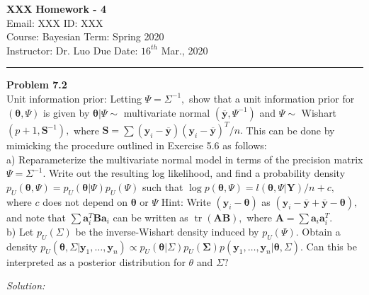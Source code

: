 \documentclass[a4paper, 11pt]{article}
\newenvironment{problem}[2][Problem]
    { \begin{mdframed}[backgroundcolor=gray!20] \textbf{#1 #2} \\}
    {  \end{mdframed}}
\newenvironment{solution}
    {\textit{Solution:}}
    {}
\begin{document}
\noindent
\large\textbf{XXX} \hfill \textbf{Homework - 4}   \\
Email: XXX \hfill ID: XXX \\
\normalsize Course: Bayesian \hfill Term: Spring 2020\\
Instructor: Dr. Luo  \hfill Due Date: $16^{th}$ Mar., 2020 \\
\noindent\rule{7in}{2.8pt}

\begin{problem}{7.2}
Unit information prior: Letting $\Psi=\Sigma^{-1},$ show that a unit information prior for $(\boldsymbol{\theta}, \Psi)$ is given by $\boldsymbol{\theta} | \Psi \sim$ multivariate normal $\left(\overline{\boldsymbol{y}}, \Psi^{-1}\right)$ and $\Psi \sim$ Wishart $\left(p+1, \mathbf{S}^{-1}\right),$ where $\mathbf{S}=\sum\left(\boldsymbol{y}_{i}-\overline{\boldsymbol{y}}\right)\left(\boldsymbol{y}_{i}-\overline{\boldsymbol{y}}\right)^{T} / n .$ This can be done by mimicking the procedure outlined in Exercise 5.6 as follows: \\
a) Reparameterize the multivariate normal model in terms of the precision matrix $\Psi=\Sigma^{-1} .$ Write out the resulting log likelihood, and find a probability density $p_{U}(\boldsymbol{\theta}, \Psi)=p_{U}(\boldsymbol{\theta} | \Psi) p_{U}(\Psi)$ such that
$\log p(\boldsymbol{\theta}, \Psi)=l(\boldsymbol{\theta}, \Psi | \mathbf{Y}) / n+c,$ where $c$ does not depend on $\boldsymbol{\theta}$ or $\Psi$
Hint: Write $\left(\boldsymbol{y}_{i}-\boldsymbol{\theta}\right)$ as $\left(\boldsymbol{y}_{i}-\overline{\boldsymbol{y}}+\overline{\boldsymbol{y}}-\boldsymbol{\theta}\right),$ and note that $\sum \boldsymbol{a}_{i}^{T} \mathbf{B} \boldsymbol{a}_{i}$ can
be written as $\operatorname{tr}(\mathbf{A B}),$ where $\mathbf{A}=\sum \boldsymbol{a}_{i} \boldsymbol{a}_{i}^{T}$.\\
b) Let $p_{U}(\Sigma)$ be the inverse-Wishart density induced by $p_{U}(\Psi)$. Obtain a density $p_{U}\left(\boldsymbol{\theta}, \Sigma | \boldsymbol{y}_{1}, \ldots, \boldsymbol{y}_{n}\right) \propto p_{U}(\boldsymbol{\theta} | \Sigma) p_{U}(\boldsymbol{\Sigma}) p\left(\boldsymbol{y}_{1}, \ldots, \boldsymbol{y}_{n} | \boldsymbol{\theta}, \Sigma\right) .$ Can
this be interpreted as a posterior distribution for $\theta$ and $\Sigma ?$ 
\end{problem}
\begin{solution}



\end{solution} 
\end{document}
